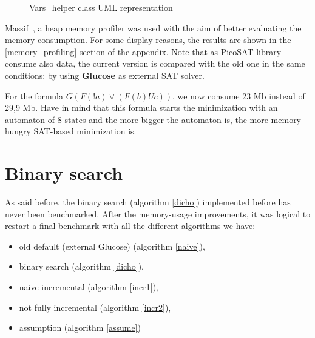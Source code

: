 \begin{figure}[h]
  \centering
  \caption{Vars\_helper class UML representation}
  \label{fig:vars_helper_uml}
\end{figure}

Massif~\cite{24}, a heap memory profiler was used with the aim of better evaluating the memory
consumption. For some display reasons, the results are shown in the \ref{memory_profiling}
section of the appendix. Note that as PicoSAT library consume also data, the current version is compared
with the old one in the same conditions: by using \textbf{Glucose} as external SAT solver.

For the formula $G(F(!a) \lor (F(b) U c))$, we now consume 23 Mb instead of 29,9 Mb. Have in mind that
this formula starts the minimization with an automaton of 8 states and the more bigger the automaton is, the
more memory-hungry SAT-based minimization is.

\section{Binary search}
As said before, the binary search (algorithm \ref{dicho}) implemented before has never been benchmarked.
After the memory-usage improvements, it was logical to restart a final benchmark with all the different
algorithms we have:
\begin{itemize}
 \item old default (external Glucose) (algorithm \ref{naive}),
 \item binary search (algorithm \ref{dicho}),
 \item naive incremental (algorithm \ref{incr1}),
 \item not fully incremental (algorithm \ref{incr2}),
 \item assumption (algorithm \ref{assume})
\end{itemize}

